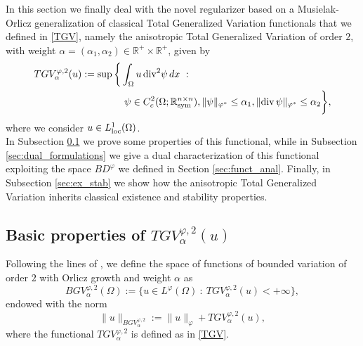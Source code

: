 \documentclass[a4paper,11pt,oneside,notitlepage]{article}
\numberwithin{equation}{section}
\def\R{\mathbb{R}}
\def\loc{{\rm loc}}
\def\sym{{\rm sym}}
\renewcommand{\div}{\mathrm{div}}
\newcommand{\vphi}{\varphi}
\newcommand{\st}{ \ : \ }
\begin{document}
In this section we finally deal with the novel regularizer based on a Musielak-Orlicz generalization of classical Total Generalized Variation functionals that we defined in \eqref{TGV}, namely the anisotropic Total Generalized Variation of order $2$, with weight $\alpha = (\alpha_1, \alpha_2) \in \R^+ \times \R^+$, given by
\begin{equation*}
\begin{aligned}
    TGV^{\vphi,2}_\alpha(u):= \sup\bigg\{ &\int_\Omega u \,\div^2 \psi \, dx \st \\
    & \ \psi \in C^2_c (\Omega; \R^{n \times n}_\sym), \|\psi\|_{\vphi^*} \le \alpha_1, \|\div \, \psi\|_{\vphi^*} \le \alpha_2 \bigg\},
\end{aligned}
\end{equation*}
where we consider $u \in L^1_\loc(\Omega)$.
\\
In Subsection \ref{sec:tgv_prop} we prove some properties of this functional, while in Subsection \ref{sec:dual_formulations} we give a dual characterization of this functional exploiting the space $BD^\vphi$ we defined in Section \ref{sec:funct_anal}. Finally, in Subsection \ref{sec:ex_stab} we show how the anisotropic Total Generalized Variation inherits classical existence and stability properties.


\subsection{Basic properties of \texorpdfstring{$TGV^{\vphi,2}_\alpha(u)$}{TGV}}
\label{sec:tgv_prop}

Following the lines of \cite{BKP10}, we define the space of functions of  bounded variation of order $2$ with Orlicz growth and weight $\alpha$ as
\begin{equation}
\label{def:BGV}
    BGV^{\vphi,2}_\alpha(\Omega) := \{ u \in L^\vphi(\Omega) \st TGV^{\vphi,2}_\alpha(u) < +\infty \},
\end{equation}
endowed with the norm
\begin{equation*}
    \|u\|_{BGV^{\vphi,2}_\alpha} := \|u\|_\vphi + TGV^{\vphi,2}_\alpha(u),
\end{equation*}
where the functional $TGV^{\vphi,2}_\alpha$ is defined as in \eqref{TGV}.
\end{document}
